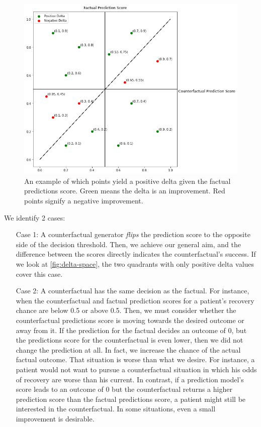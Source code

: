 \documentclass[./../../paper.tex]{subfiles}
\begin{document}
\begin{figure}[htbp]
    \centering
    \includegraphics[width=\textwidth]{figures/generated/delta-space.png}
    \caption{An example of which points yield a positive delta given the factual predictions score. Green means the delta is an improvement. Red points signify a negative improvement.}
    \label{fig:delta-space}    
\end{figure}

We identify 2 cases:
\begin{enumerate}
    \item[Case 1:] A counterfactual generator \emph{flips} the prediction score to the opposite side of the decision threshold. Then, we achieve our general aim, and the difference between the scores directly indicates the counterfactual's success. If we look at \autoref{fig:delta-space}, the two quadrants with only positive delta values cover this case.   
    \item[Case 2:] A counterfactual has the same decision as the factual. For instance, when the counterfactual and factual prediction scores for a patient's recovery chance are below 0.5 or above 0.5. Then, we must consider whether the counterfactual predictions score is moving towards the desired outcome or away from it. 
    \subitem[2.1] If the prediction for the factual decides an outcome of 0, but the predictions score for the counterfactual is even lower, then we did not change the prediction at all. In fact, we increase the chance of the actual factual outcome. That situation is worse than what we desire. For instance, a patient would not want to pursue a counterfactual situation in which his odds of recovery are worse than his current.   
    \subitem[2.2] In contrast, if a prediction model's score leads to an outcome of 0 but the counterfactual returns a higher prediction score than the factual predictions score, a patient might still be interested in the counterfactual. In some situations, even a small improvement is desirable.   
\end{enumerate}
\end{document}
